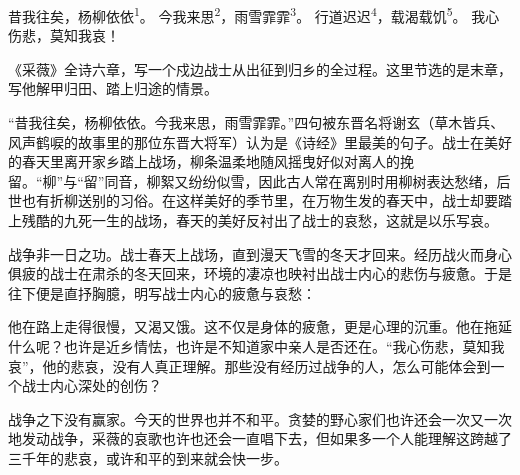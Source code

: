 
\begin{poem}
昔我往矣，杨柳依依\textsuperscript{1}。
今我来思\textsuperscript{2}，雨雪霏霏\textsuperscript{3}。
行道迟迟\textsuperscript{4}，载渴载饥\textsuperscript{5}。
我心伤悲，莫知我哀！
\end{poem}

\begin{annotations}
\end{annotations}

\begin{appreciation}
《采薇》全诗六章，写一个戍边战士从出征到归乡的全过程。这里节选的是末章，写他解甲归田、踏上归途的情景。

“昔我往矣，杨柳依依。今我来思，雨雪霏霏。”四句被东晋名将谢玄（草木皆兵、风声鹤唳的故事里的那位东晋大将军）认为是《诗经》里最美的句子。战士在美好的春天里离开家乡踏上战场，柳条温柔地随风摇曳好似对离人的挽留。“柳”与“留”同音，柳絮又纷纷似雪，因此古人常在离别时用柳树表达愁绪，后世也有折柳送别的习俗。在这样美好的季节里，在万物生发的春天中，战士却要踏上残酷的九死一生的战场，春天的美好反衬出了战士的哀愁，这就是以乐写哀。

战争非一日之功。战士春天上战场，直到漫天飞雪的冬天才回来。经历战火而身心俱疲的战士在肃杀的冬天回来，环境的凄凉也映衬出战士内心的悲伤与疲惫。于是往下便是直抒胸臆，明写战士内心的疲惫与哀愁：

他在路上走得很慢，又渴又饿。这不仅是身体的疲惫，更是心理的沉重。他在拖延什么呢？也许是近乡情怯，也许是不知道家中亲人是否还在。“我心伤悲，莫知我哀”，他的悲哀，没有人真正理解。那些没有经历过战争的人，怎么可能体会到一个战士内心深处的创伤？

战争之下没有赢家。今天的世界也并不和平。贪婪的野心家们也许还会一次又一次地发动战争，采薇的哀歌也许也还会一直唱下去，但如果多一个人能理解这跨越了三千年的悲哀，或许和平的到来就会快一步。
\end{appreciation}
